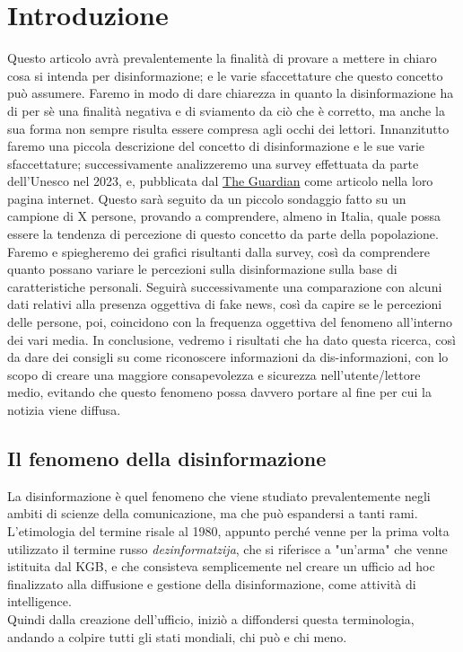 \documentclass{article}
\begin{document}
\centering \tableofcontents
\newpage \section{Introduzione}
\flushleft
\begin{justify}
    Questo articolo avrà prevalentemente la finalità di provare a mettere in chiaro cosa si intenda per disinformazione; e le varie sfaccettature che questo concetto può assumere.
    Faremo in modo di dare chiarezza in quanto la disinformazione ha di per sè una finalità negativa e di sviamento da ciò che è corretto, ma anche la sua forma non sempre risulta essere compresa agli occhi dei lettori.
    Innanzitutto faremo una piccola descrizione del concetto di disinformazione e le sue varie sfaccettature; successivamente analizzeremo una survey effettuata da parte dell'Unesco nel 2023, e, pubblicata dal \href{https://www.theguardian.com/technology/2023/nov/07/85-of-people-worry-about-online-disinformation-global-survey-finds}{The Guardian}\label{:articolo} come articolo nella loro pagina internet. Questo sarà seguito da un piccolo sondaggio fatto su un campione di X persone, provando a comprendere, almeno in Italia, quale possa essere la tendenza di percezione di questo concetto da parte della popolazione.
    Faremo e spiegheremo dei grafici risultanti dalla survey, così da comprendere quanto possano variare le percezioni sulla disinformazione sulla base di caratteristiche personali. 
    Seguirà successivamente una comparazione con alcuni dati relativi alla presenza oggettiva di fake news, così da capire se le percezioni delle persone, poi, coincidono con la frequenza oggettiva del fenomeno all'interno dei vari media.
    In conclusione, vedremo i risultati che ha dato questa ricerca, così da dare dei consigli su come riconoscere informazioni da dis-informazioni, con lo scopo di creare una maggiore consapevolezza e sicurezza nell'utente/lettore medio, evitando che questo fenomeno possa davvero portare al fine per cui la notizia viene diffusa.
    
\end{justify}
\begin{center}
\newpage \section{Il fenomeno della disinformazione}
\end{center}
\begin{justify}
    La disinformazione è quel fenomeno che viene studiato prevalentemente negli ambiti di scienze della comunicazione, ma che può espandersi a tanti rami.
    L'etimologia del termine risale al 1980, appunto perché venne per la prima volta utilizzato il termine russo \textit{dezinformatzija}, che si riferisce a "un'arma" che venne istituita dal KGB, e che consisteva semplicemente nel creare un ufficio ad hoc finalizzato alla diffusione e gestione della disinformazione, come attività di intelligence.\citep{DisWiki}\\
    Quindi dalla creazione dell'ufficio, iniziò a diffondersi questa terminologia, andando a colpire tutti gli stati mondiali, chi può e chi meno.
\end{justify}
\end{document}
